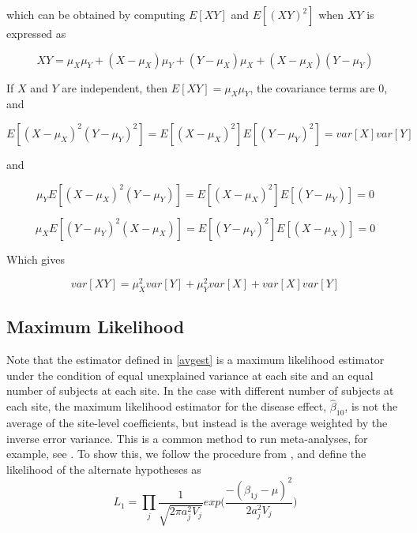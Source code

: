 \documentclass{article}
\begin{document}
which can be obtained by computing $E[XY]$ and $E[(XY)^2]$ when $XY$ is expressed as

\begin{equation}
XY = \mu_X\mu_Y + (X-\mu_X)\mu_Y + (Y-\mu_X)\mu_X + (X-\mu_X)(Y-\mu_Y)
\end{equation}

If $X$ and $Y$ are independent, then $E[XY] = \mu_X\mu_Y$, the covariance terms are 0, and

\begin{equation}
E[(X-\mu_X)^2(Y-\mu_Y)^2] = E[(X-\mu_X)^2]E[(Y-\mu_Y)^2] = var[X]var[Y]
\end{equation}

and

\begin{equation}
\mu_YE[(X-\mu_X)^2(Y-\mu_Y)] = E[(X-\mu_X)^2]E[(Y-\mu_Y)] = 0
\end{equation}

\begin{equation}
\mu_XE[(Y-\mu_Y)^2(X-\mu_X)] = E[(Y-\mu_Y)^2]E[(X-\mu_X)] = 0
\end{equation}

Which gives

\begin{equation}
var[XY] = \mu_X^2var[Y] + \mu_Y^2var[X] + var[X]var[Y]
\end{equation}


\subsection{Maximum Likelihood}
Note that the estimator defined in \ref{avgest} is a maximum likelihood estimator under the condition of equal unexplained variance at each site and an equal number of subjects at each site. In the case with different number of subjects at each site, the maximum likelihood estimator for the disease effect, $\hat{\beta}_{10}$, is not the average of the site-level coefficients, but instead is the average weighted by the inverse error variance. This is a common method to run meta-analyses, for example, see \cite{enigmarandom,thompson2014enigma}. To show this, we follow the procedure from \cite{enigmarandom}, and define the likelihood of the alternate hypotheses as
%
\begin{equation}
\label{mle}
L_1 = \prod\limits_j\frac{1}{\sqrt{2\pi a_j^2 V_j}}exp\Big(\frac{-(\beta_{1j}- \mu)^2}{2 a_j^2 V_j}\Big)
\end{equation}
\end{document}
